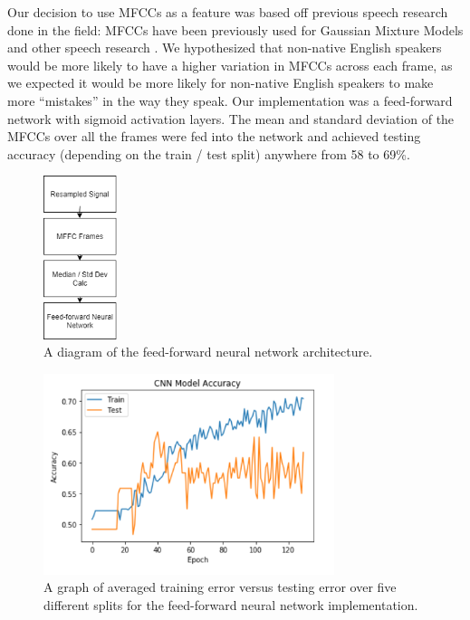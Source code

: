 \documentclass{article}
\begin{document}
Our decision to use MFCCs as a feature was based off previous speech research done in the field: MFCCs have been previously used for Gaussian Mixture Models and other speech research \cite{mfccs, chuaccent}.
We hypothesized that non-native English speakers would be more likely to have a higher variation in MFCCs across each frame, as we expected it would be more likely for non-native English speakers to make more “mistakes” in the way they speak.
Our implementation was a feed-forward network with sigmoid activation layers. The mean and standard deviation of the MFCCs over all the frames were fed into the network and achieved testing accuracy (depending on the train / test split) anywhere from 58 to 69\%.

\begin{figure}[htb]
	\centering
	\includegraphics[width = 2.15cm]{figs/ff_architecture}
	\caption{A diagram of the feed-forward neural network architecture.}
	\label{fig:ff_architecture}
\end{figure}

\begin{figure}[htb]
	\centering
	\includegraphics[width = 8.5cm]{figs/ff_graph}
	\caption{A graph of averaged training error versus testing error over five different splits for the feed-forward neural network implementation.}
	\label{fig:ff_graph}
\end{figure}
\end{document}
